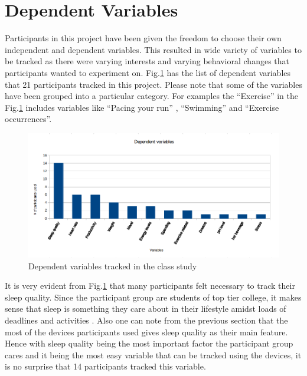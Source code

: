 \section{Dependent Variables}
Participants in this project have been given the freedom to choose their own independent and dependent variables. This resulted in wide variety of variables to be tracked as there were varying interests and varying behavioral changes that participants wanted to experiment on. Fig.\ref{fig:variables} has the list of dependent variables that 21 participants tracked in this project. Please note that some of the variables have been grouped into a particular category. For examples the \enquote{Exercise} in the Fig.\ref{fig:variables} includes variables like \enquote{Pacing your run}  , \enquote{Swimming} and \enquote{Exercise occurrences}.

\begin{figure}[!t]\centering
\includegraphics[width=1.0\columnwidth]{images/dependent_variables.png}
\caption{\footnotesize Dependent variables tracked in the class study \label{fig:variables} 
}%
\end{figure}
%
It is very evident from Fig.\ref{fig:variables} that many participants felt necessary to track their sleep quality. Since the participant group are students of top tier college, it makes sense that sleep is something they care about in their lifestyle amidst loads of deadlines and activities \cite{hershner2014causes} \cite{lund2010sleep}. Also one can note from the previous section that the most of the devices participants used gives sleep quality as their main feature. Hence with sleep quality being the most important factor the participant group cares and it being the most easy variable that can be tracked using the devices, it is no surprise that 14 participants tracked this variable. 

